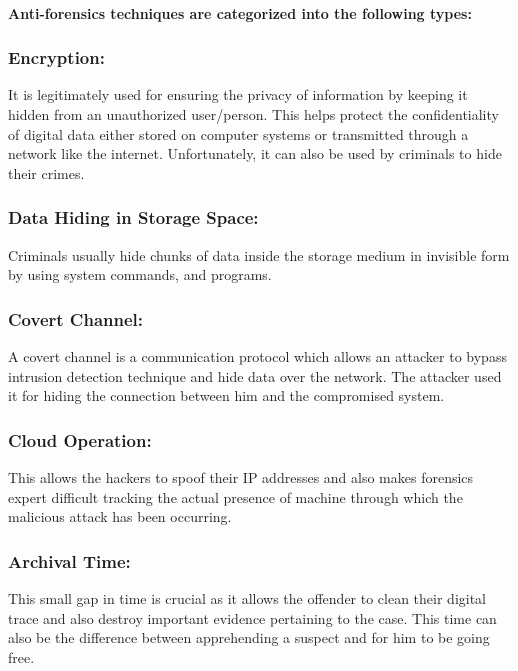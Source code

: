 \documentclass[british]{article}
\begin{document}
\paragraph*{Anti-forensics techniques are categorized into the following types:}

\subsubsection{Encryption:}

It is legitimately used for ensuring the privacy of information by
keeping it hidden from an unauthorized user/person. This helps protect
the confidentiality of digital data either stored on computer systems
or transmitted through a network like the internet. Unfortunately,
it can also be used by criminals to hide their crimes.

\subsubsection{Data Hiding in Storage Space:}

Criminals usually hide chunks of data inside the storage medium in
invisible form by using system commands, and programs.

\subsubsection{Covert Channel:}

A covert channel is a communication protocol which allows an attacker
to bypass intrusion detection technique and hide data over the network.
The attacker used it for hiding the connection between him and the
compromised system.

\subsubsection{Cloud Operation: }

This allows the hackers to spoof their IP addresses and also makes
forensics expert difficult tracking the actual presence of machine
through which the malicious attack has been occurring.

\subsubsection{Archival Time:}

This small gap in time is crucial as it allows the offender to clean
their digital trace and also destroy important evidence pertaining
to the case. This time can also be the difference between apprehending
a suspect and for him to be going free.
\end{document}
